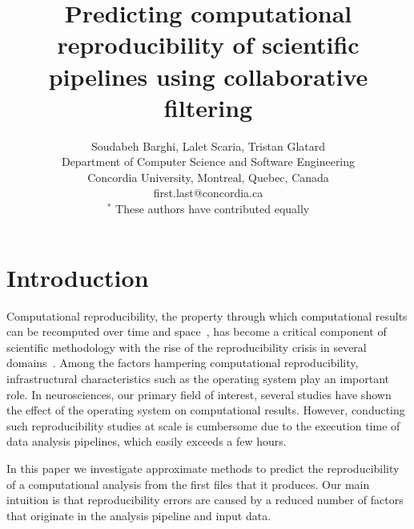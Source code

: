 \documentclass[10pt, conference, compsocconf]{IEEEtran}
\begin{document}
\title{Predicting computational reproducibility of scientific pipelines using collaborative filtering}

\author{Soudabeh Barghi, Lalet Scaria, Tristan Glatard\\
  Department of Computer Science and Software Engineering\\ Concordia University, Montreal, Quebec, Canada\\
  {first.last}@concordia.ca\\
  $^*$ These authors have contributed equally
}

\maketitle

\begin{abstract}
\end{abstract}


\section{Introduction}

Computational reproducibility, the property through which
computational results can be recomputed over time and
space~\cite{stodden}, has become a critical component of scientific
methodology with the rise of the reproducibility crisis in several
domains~\cite{xxx}. Among the factors hampering computational
reproducibility, infrastructural characteristics such as the operating
system play an important role. In neurosciences, our primary field of
interest, several studies have shown the effect of the operating
system on computational results. However, conducting such
reproducibility studies at scale is cumbersome due to the execution
time of data analysis pipelines, which easily exceeds a few hours.

In this paper we investigate approximate methods to predict the
reproducibility of a computational analysis from the first files that
it produces. Our main intuition is that reproducibility errors are
caused by a reduced number of factors that originate in the analysis
pipeline and input data. 



\end{document}

